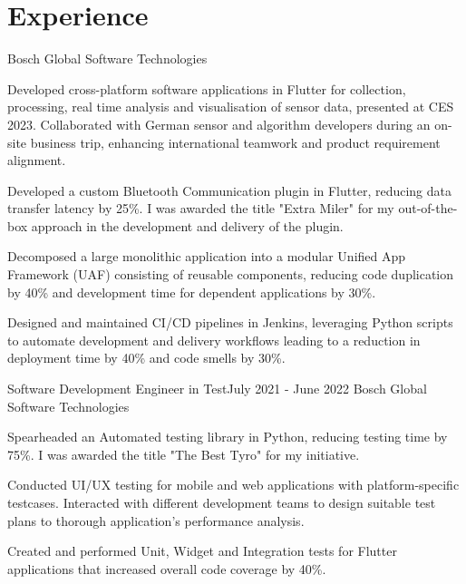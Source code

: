 \vspace{-5pt}
\section{Experience}
\resumeSubHeadingListStart
    {Bosch Global Software Technologies}{}
    \resumeItemListStart
          {
\item Developed cross-platform software applications in Flutter for collection, processing, real time analysis and visualisation of sensor data, presented at CES 2023. Collaborated with German sensor and algorithm developers during an on-site business trip, enhancing international teamwork and product requirement alignment.
  \item Developed a custom Bluetooth Communication plugin in Flutter, reducing data transfer latency by 25\%. I was awarded the title "Extra Miler" for my out-of-the-box approach in the development and delivery of the plugin.
  \item  Decomposed a large monolithic application into a modular Unified App Framework (UAF) consisting of reusable components, reducing code duplication by 40\% and development time for dependent applications by 30\%. 
   \item Designed and maintained CI/CD pipelines in Jenkins, leveraging Python scripts to automate development and delivery workflows leading to a reduction in deployment time by 40\% and code smells by 30\%.


}      \resumeItemListEnd
\vspace{-1pt}

    \resumeSubheading
		{Software Development Engineer in Test}{July 2021 - June 2022}
		{Bosch Global Software Technologies}{}
		\resumeItemListStart
        \item Spearheaded an Automated testing library in Python, reducing testing time by 75\%. I was awarded the title "The Best Tyro" for my initiative.
        \item Conducted UI/UX testing for mobile and web applications with platform-specific testcases. Interacted with different development teams to design suitable test plans to thorough application's performance analysis.
        \item Created and performed Unit, Widget and Integration tests for Flutter applications that increased overall code coverage by 40\%.
	\resumeItemListEnd
    \vspace{-1pt}
    
